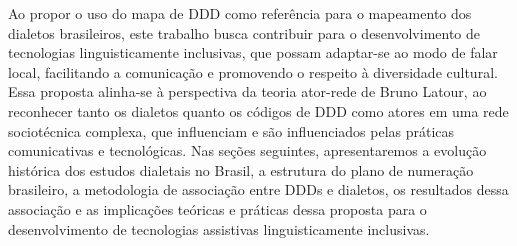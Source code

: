 \begin{flushleft}
Ao propor o uso do mapa de DDD como referência para o mapeamento dos dialetos brasileiros, este trabalho busca contribuir para o desenvolvimento de tecnologias linguisticamente inclusivas, que possam adaptar-se ao modo de falar local, facilitando a comunicação e promovendo o respeito à diversidade cultural. Essa proposta alinha-se à perspectiva da teoria ator-rede de Bruno Latour, ao reconhecer tanto os dialetos quanto os códigos de DDD como atores em uma rede sociotécnica complexa, que influenciam e são influenciados pelas práticas comunicativas e tecnológicas.
Nas seções seguintes, apresentaremos a evolução histórica dos estudos dialetais no Brasil, a estrutura do plano de numeração brasileiro, a metodologia de associação entre DDDs e dialetos, os resultados dessa associação e as implicações teóricas e práticas dessa proposta para o desenvolvimento de tecnologias assistivas linguisticamente inclusivas.

	
	
	
	
\end{flushleft}


